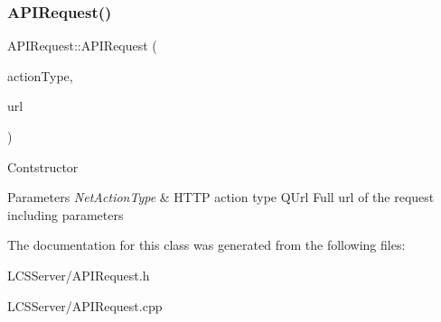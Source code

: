\subsubsection{\texorpdfstring{A\+P\+I\+Request()}{APIRequest()}}
{\footnotesize\ttfamily A\+P\+I\+Request\+::\+A\+P\+I\+Request (\begin{DoxyParamCaption}\item[{Net\+Action\+Type}]{action\+Type,  }\item[{const Q\+Url}]{url }\end{DoxyParamCaption})}

Contstructor 
\begin{DoxyParams}{Parameters}
{\em Net\+Action\+Type} & H\+T\+TP action type  Q\+Url Full url of the request including parameters \\
\hline
\end{DoxyParams}


The documentation for this class was generated from the following files\+:\begin{DoxyCompactItemize}
\item 
L\+C\+S\+Server/A\+P\+I\+Request.\+h\item 
L\+C\+S\+Server/A\+P\+I\+Request.\+cpp\end{DoxyCompactItemize}

